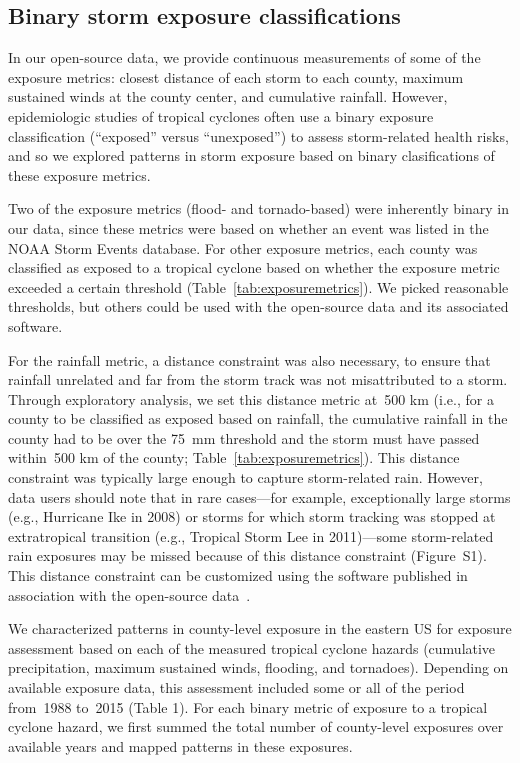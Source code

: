\subsection*{Binary storm exposure classifications}

In our open-source data, we provide continuous measurements of some of the
exposure metrics: closest distance of each storm to each county, maximum
sustained winds at the county center, and cumulative rainfall. However,
epidemiologic studies of tropical cyclones often use a binary exposure
classification (``exposed'' versus ``unexposed'') to assess storm-related
health risks, and so we explored patterns in storm exposure based on binary
clasifications of these exposure metrics. 

Two of the exposure metrics (flood- and tornado-based) were inherently binary
in our data, since these metrics were based on whether an event was listed in
the NOAA Storm Events database.  For other exposure metrics, each county
was classified as exposed to a tropical cyclone based on whether the exposure
metric exceeded a certain threshold (Table~\ref{tab:exposuremetrics}). We
picked reasonable thresholds, but others could be used with the open-source
data and its associated software. 

For the rainfall metric, a distance constraint was also necessary, to ensure
that rainfall unrelated and far from the storm track was not misattributed to a
storm. Through exploratory analysis, we set this distance metric at~500
\si{\kilo\metre} (i.e., for a county to be classified as exposed based on
rainfall, the cumulative rainfall in the county had to be over the
75~\si{\milli\metre} threshold and the storm must have passed
within~500 \si{\kilo\metre} of the county; Table~\ref{tab:exposuremetrics}).
This distance constraint was typically large enough to capture storm-related
rain.  However, data users should note that in rare cases---for example,
exceptionally large storms (e.g., Hurricane Ike in 2008) or storms for which
storm tracking was stopped at extratropical transition (e.g., Tropical Storm
Lee in 2011)---some storm-related rain exposures may be missed because of this
distance constraint (Figure~S1). This distance constraint can be customized
using the software published in association with the open-source
data~\parencite{hurricaneexposure}.

We characterized patterns in county-level exposure in the eastern \ac{US} for
exposure assessment based on each of the measured tropical cyclone hazards
(cumulative precipitation, maximum sustained winds, flooding, and tornadoes).
Depending on available exposure data, this assessment included some or all of
the period from~1988 to~2015 (Table 1). For each binary metric of exposure to a
tropical cyclone hazard, we first summed the total number of county-level
exposures over available years and mapped patterns in
these exposures. 

